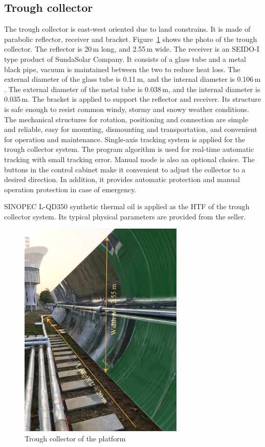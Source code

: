 \subsection{Trough collector}
The trough collector is east-west oriented due to land constrains. It is made of parabolic reflector, receiver and bracket. Figure~\ref{fig:TroughCollector} shows the photo of the trough collector. The reflector is 20$\,\mathrm{m}$ long, and 2.55$\,\mathrm{m}$ wide. The receiver is an SEIDO-I type product of SundaSolar Company. It consists of a glass tube and a metal black pipe, vacuum is maintained between the two to reduce heat loss. 
The external diameter of the glass tube is 0.11$\,\mathrm{m}$, and the internal diameter is 0.106$\,\mathrm{m}$.
The external diameter of the metal tube is 0.038$\,\mathrm{m}$, and the internal diameter is 0.035$\,\mathrm{m}$.
The bracket is applied to support the reflector and receiver. Its structure is safe enough to resist common windy, stormy and snowy weather conditions. The mechanical structures for rotation, positioning and connection are simple and reliable, easy for mounting, dismounting and transportation, and convenient for operation and maintenance.
Single-axis tracking system is applied for the trough collector system. The program algorithm is used for real-time automatic tracking with small tracking error. Manual mode is also an optional choice. The buttons in the control cabinet make it convenient to adjust the collector to a desired direction. In addition, it provides automatic protection and manual operation protection in case of emergency.

SINOPEC L-QD350 synthetic thermal oil is applied as the HTF of the trough collector system. Its typical physical parameters are provided from the seller.

\begin{figure}[!ht]
\centering
\includegraphics[width=0.7\textwidth]{fig/TroughCollector.jpg}
\caption{Trough collector of the platform}\label{fig:TroughCollector}
\end{figure}

